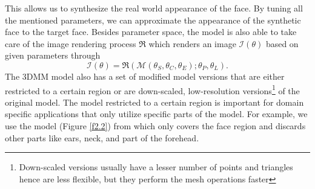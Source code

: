 This allows us to synthesize the real world appearance of the face. By tuning all the mentioned parameters, we can approximate the appearance of the synthetic face to the target face. Besides parameter space, the model is also able to take care of the image rendering process $\Re$ which renders an image $\mathcal{I}(\theta)$ based on given parameters through 
\begin{equation}
    \mathcal{I}(\theta) = \Re(\mathcal{M}(\theta_S, \theta_C, \theta_E); \theta_P, \theta_L).
\end{equation}    
The 3DMM model also has a set of modified model versions that are either restricted to a certain region or are down-scaled, low-resolution versions\footnote{Down-scaled versions usually have a lesser number of points and triangles hence are less flexible, but they perform the mesh operations faster} of the original model. The model restricted to a certain region is important for domain specific applications that only utilize specific parts of the model. For example, we use the model (Figure \ref{f2.2}) from \cite{Schoenborn2017} which only covers the face region and discards other parts like ears, neck, and part of the forehead. 


